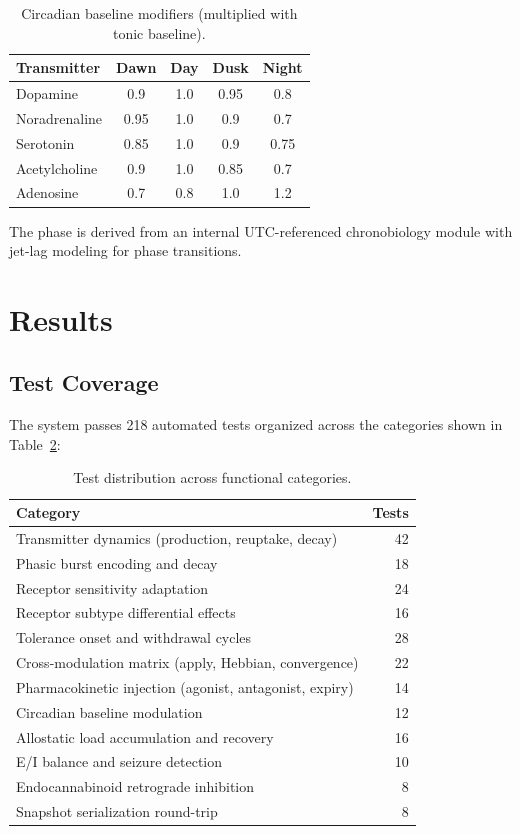 \documentclass[11pt,a4paper]{article}
\begin{document}
\begin{table}[h]
\centering
\caption{Circadian baseline modifiers (multiplied with tonic baseline).}
\label{tab:circadian}
\begin{tabular}{lcccc}
\toprule
\textbf{Transmitter} & \textbf{Dawn} & \textbf{Day} & \textbf{Dusk} & \textbf{Night} \\
\midrule
Dopamine & 0.9 & 1.0 & 0.95 & 0.8 \\
Noradrenaline & 0.95 & 1.0 & 0.9 & 0.7 \\
Serotonin & 0.85 & 1.0 & 0.9 & 0.75 \\
Acetylcholine & 0.9 & 1.0 & 0.85 & 0.7 \\
Adenosine & 0.7 & 0.8 & 1.0 & 1.2 \\
\bottomrule
\end{tabular}
\end{table}

The phase is derived from an internal UTC-referenced chronobiology module with jet-lag modeling for phase transitions.

\section{Results}

\subsection{Test Coverage}

The system passes 218 automated tests organized across the categories shown in Table~\ref{tab:tests}:

\begin{table}[h]
\centering
\caption{Test distribution across functional categories.}
\label{tab:tests}
\begin{tabular}{lr}
\toprule
\textbf{Category} & \textbf{Tests} \\
\midrule
Transmitter dynamics (production, reuptake, decay) & 42 \\
Phasic burst encoding and decay & 18 \\
Receptor sensitivity adaptation & 24 \\
Receptor subtype differential effects & 16 \\
Tolerance onset and withdrawal cycles & 28 \\
Cross-modulation matrix (apply, Hebbian, convergence) & 22 \\
Pharmacokinetic injection (agonist, antagonist, expiry) & 14 \\
Circadian baseline modulation & 12 \\
Allostatic load accumulation and recovery & 16 \\
E/I balance and seizure detection & 10 \\
Endocannabinoid retrograde inhibition & 8 \\
Snapshot serialization round-trip & 8 \\
\bottomrule
\end{tabular}
\end{table}
\end{document}
